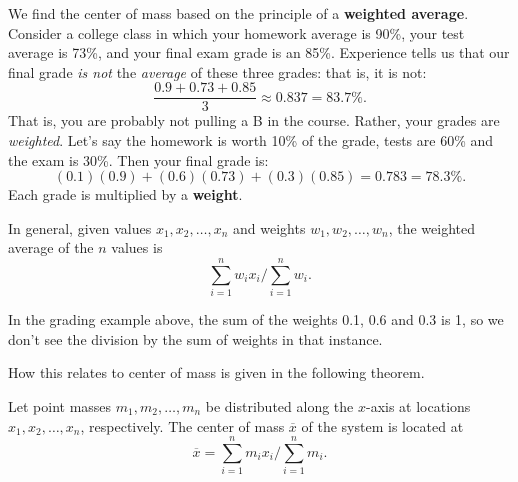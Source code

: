 We find the center of mass based on the principle of a \textbf{weighted average}. Consider a college class in which your homework average is 90\%, your test average is 73\%, and your final exam grade is an 85\%. Experience tells us that our final grade \emph{is not} the \emph{average} of these three grades: that is, it is not:
\[\frac{0.9+0.73+0.85}{3} \approx 0.837 = 83.7\text{\%}.\]
That is, you are probably not pulling a B in the course. Rather, your grades are \emph{weighted}. Let's say the homework is worth 10\% of the grade, tests are 60\% and the exam is 30\%. Then your final grade is:
\[(0.1)(0.9) + (0.6)(0.73)+(0.3)(0.85) = 0.783 = 78.3\text{\%}.\]
Each grade is multiplied by a \textbf{weight}. 

In general, given values $x_1,x_2,\dots,x_n$ and weights $w_1,w_2,\dots,w_n$, the weighted average of the $n$ values is
\[\sum_{i=1}^n w_ix_i\Bigg/\sum_{i=1}^n w_i.\]

In the grading example above, the sum of the weights 0.1, 0.6 and 0.3 is 1, so we don't see the division by the sum of weights in that instance.

How this relates to center of mass is given in the following theorem.

\begin{theorem}\label{thm:center_mass_points}%
Let point masses $m_1,m_2,\dots,m_n$ be distributed along the $x$-axis at locations $x_1,x_2,\dots,x_n$, respectively. The center of mass $\overline{x}$ of the system is located at
\[\overline{x} = \sum_{i=1}^nm_ix_i\Bigg/\sum_{i=1}^n m_i.\]
\end{theorem}

